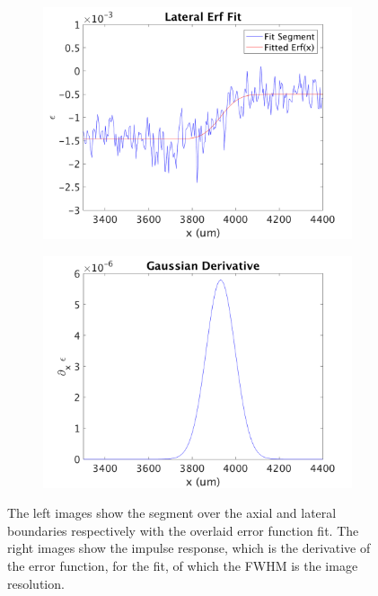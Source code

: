 \begin{figure}[t]
\begin{subfigure}{0.49\textwidth}
		\includegraphics[width=\textwidth]{figures/lateral_erf_fit.png}
	\end{subfigure}
	\begin{subfigure}{0.49\textwidth}
		\centering
		\includegraphics[width=\textwidth]{figures/lateral_impulse_response.png}
	\end{subfigure}
	\caption{The left images show the segment over the axial and lateral boundaries respectively with the overlaid error function fit. The right images show the impulse response, which is the derivative of the error function, for the fit, of which the FWHM is the image resolution.}
	\label{error_fit_example}	
\end{figure}

